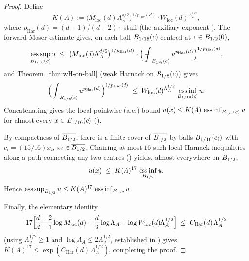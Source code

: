 \begin{proof}
\leanok
{}

Define
\begin{equation*}
K(A) := \bigl(M_{\mathrm{loc}}(d)\Lambda_A^{d/2}\bigr)^{1/p_{\mathrm{Har}}(d)}
        \cdot W_{\mathrm{loc}}(d)^{\Lambda_A^{1/2}},
\end{equation*}
where $p_{\mathrm{Har}}(d) = (d-1)/(d-2) \cdot$ stuff (the auxiliary
exponent ). The forward Moser estimate gives, on each
ball $B_{1/16}(c)$ centred at $c \in B_{1/2}(0)$,
\begin{equation*}
  \esssup_{\Ball{1/16}{c}} u
   \;\leq\; \bigl(M_{\mathrm{loc}}(d)\Lambda_A^{d/2}\bigr)^{1/p_{\mathrm{Har}}(d)}
        \cdot \Bigl(\fint_{\Ball{1/8}{c}} u^{p_{\mathrm{Har}}(d)}\Bigr)^{1/p_{\mathrm{Har}}(d)},
\end{equation*}
and Theorem~\ref{thm:wH-on-ball} (weak Harnack on $B_{1/8}(c)$) gives
\begin{equation*}
  \Bigl(\fint_{\Ball{1/8}{c}} u^{p_{\mathrm{Har}}(d)}\Bigr)^{1/p_{\mathrm{Har}}(d)}
        \;\leq\; W_{\mathrm{loc}}(d)^{\Lambda_A^{1/2}}\,
        \essinf_{\Ball{1/16}{c}} u.
\end{equation*}
Concatenating gives the local pointwise (a.e.) bound
$u(x) \leq K(A)\,\operatorname*{ess\,inf}_{B_{1/8}(c)} u$ for almost every $x \in B_{1/16}(c)$
().

By compactness of $\overline{B_{1/2}}$, there is a finite cover of
$\overline{B_{1/2}}$ by balls $B_{1/16}(c_i)$ with $c_i = (15/16) x_i$,
$x_i \in \overline{B_{1/2}}$. Chaining at most $16$ such local Harnack
inequalities along a path connecting any two centres
() yields, almost everywhere on
$B_{1/2}$,
\begin{equation*}
  u(x) \;\leq\; K(A)^{17}\,\operatorname*{ess\,inf}_{B_{1/2}} u.
\end{equation*}
Hence $\operatorname*{ess\,sup}_{B_{1/2}} u \leq K(A)^{17}\,\operatorname*{ess\,inf}_{B_{1/2}} u$.

Finally, the elementary identity
\begin{equation*}
  17\Bigl[\frac{d-2}{d-1}\log M_{\mathrm{loc}}(d) + \frac{d}{2}\log\Lambda_A
    + \log W_{\mathrm{loc}}(d) \Lambda_A^{1/2}\Bigr]
  \;\leq\; C_{\mathrm{Har}}(d)\,\Lambda_A^{1/2}
\end{equation*}
(using $\Lambda_A^{1/2} \geq 1$ and $\log\Lambda_A \leq 2\Lambda_A^{1/2}$,
established in )
gives $K(A)^{17} \leq \exp(C_{\mathrm{Har}}(d)\,\Lambda_A^{1/2})$, completing
the proof.
\end{proof}

